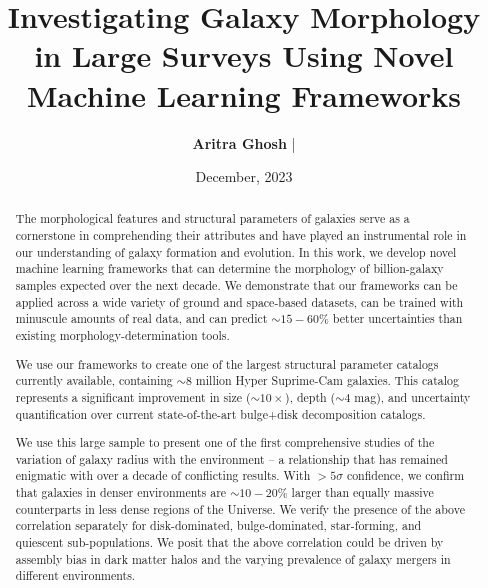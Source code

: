 \documentclass[letterpaper,10pt]{yalephd}
\begin{document}
\title{Investigating Galaxy Morphology in Large Surveys Using Novel Machine Learning Frameworks} %
\author{\textbf{Aritra Ghosh} | }
\date{December, 2023} %

\frontmatter

\begin{abstract}
The morphological features and structural parameters of galaxies serve as a cornerstone in comprehending their attributes and have played an instrumental role in our understanding of galaxy formation and evolution. In this work, we develop novel machine learning frameworks that can determine the morphology of billion-galaxy samples expected over the next decade. We demonstrate that our frameworks can be applied across a wide variety of ground and space-based datasets, can be trained with minuscule amounts of real data, and can predict $\sim15-60\%$ better uncertainties than existing morphology-determination tools.

We use our frameworks to create one of the largest structural parameter catalogs currently available, containing $\sim8$ million Hyper Suprime-Cam galaxies. This catalog represents a significant improvement in size ($\sim10\times$), depth ($\sim4$ mag), and uncertainty quantification over current state-of-the-art bulge+disk decomposition catalogs.  

We use this large sample to present one of the first comprehensive studies of the variation of galaxy radius with the environment – a relationship that has remained enigmatic with over a decade of conflicting results.  With $>5\sigma$ confidence, we confirm that galaxies in denser environments are $\sim10-20\%$ larger than equally massive counterparts in less dense regions of the Universe. We verify the presence of the above correlation separately for disk-dominated, bulge-dominated, star-forming, and quiescent sub-populations. We posit that the above correlation could be driven by assembly bias in dark matter halos and the varying prevalence of galaxy mergers in different environments.
\end{abstract}


\maketitle
{} %
\tableofcontents
\listoffigures %
\listoftables %
\end{document}
